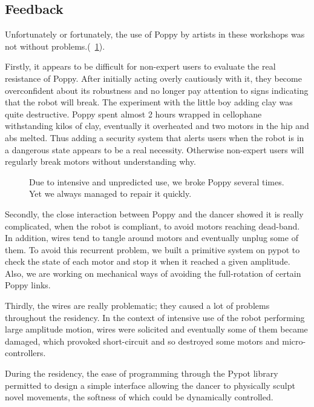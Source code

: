\subsection{Feedback} %

Unfortunately or fortunately, the use of Poppy by artists  in these workshops  was not without problems.(\figurename~\ref{fig:broken_poppy_residency}).

Firstly, it appears to be difficult for non-expert users to evaluate the real resistance of Poppy. After initially acting overly cautiously with it, they become overconfident about its robustness and no longer pay attention to signs indicating that the robot will break. The experiment with the little boy adding clay was quite destructive. Poppy spent almost 2 hours wrapped in cellophane withstanding kilos of clay, eventually it overheated and two motors in the hip and abs melted.
Thus adding a security system that alerts users when the robot is in a dangerous state appears to be a real necessity.  Otherwise non-expert users will regularly break motors without understanding why.

\begin{figure}[tb]
\centering
    \hfill
    \caption{Due to intensive and unpredicted use, we broke Poppy several times. Yet we always managed to repair it quickly.}
    \label{fig:broken_poppy_residency}
\end{figure}

Secondly, the close interaction between Poppy and the dancer showed it is really complicated, when the robot is compliant, to avoid motors reaching dead-band. In addition, wires tend to tangle around motors and eventually unplug some of them. To avoid this recurrent problem, we built a primitive system on pypot  to check the state of each motor and stop it when it reached a given amplitude. Also, we are working on mechanical ways of avoiding the full-rotation of certain Poppy links.

Thirdly, the wires are really problematic; they caused a lot of problems throughout the residency. In the context of intensive use of the robot performing large amplitude motion, wires were solicited and eventually some of them became damaged, which provoked short-circuit and so destroyed some motors and micro-controllers.

During the residency, the ease of programming through the Pypot library permitted to design a simple interface allowing the dancer to physically sculpt novel movements, the softness of which could be dynamically controlled.

